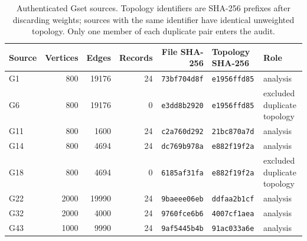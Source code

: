 \begin{table}[t]
\caption{\label{tab:data}Authenticated Gset sources. Topology identifiers are SHA-256 prefixes after discarding weights; sources with the same identifier have identical unweighted topology. Only one member of each duplicate pair enters the audit.}
\centering\small
\begin{tabular}{lrrrrll}
\toprule
Source & Vertices & Edges & Records & File SHA-256 & Topology SHA-256 & Role\\
\midrule
G1 & 800 & 19176 & 24 & \texttt{73bf704d8f} & \texttt{e1956ffd85} & analysis\\
G6 & 800 & 19176 & 0 & \texttt{e3dd8b2920} & \texttt{e1956ffd85} & excluded duplicate topology\\
G11 & 800 & 1600 & 24 & \texttt{c2a760d292} & \texttt{21bc870a7d} & analysis\\
G14 & 800 & 4694 & 24 & \texttt{dc769b978a} & \texttt{e882f19f2a} & analysis\\
G18 & 800 & 4694 & 0 & \texttt{6185af31fa} & \texttt{e882f19f2a} & excluded duplicate topology\\
G22 & 2000 & 19990 & 24 & \texttt{9baeee06eb} & \texttt{ddfaa2b1cf} & analysis\\
G32 & 2000 & 4000 & 24 & \texttt{9760fce6b6} & \texttt{4007cf1aea} & analysis\\
G43 & 1000 & 9990 & 24 & \texttt{9af5445b4b} & \texttt{91ac033a6e} & analysis\\
\bottomrule
\end{tabular}
\end{table}
